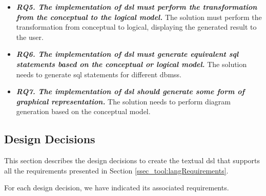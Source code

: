 \begin{itemize}
\item\textit{\textbf{RQ5. The implementation of \ac{dsl} must perform the transformation from the conceptual to the logical model.}}
The solution must perform the transformation from conceptual to logical, displaying the generated result to the user.

\item\textit{\textbf{RQ6. The implementation of \ac{dsl} must generate equivalent \ac{sql} statements based on the conceptual or logical model.}}
The solution needs to generate \ac{sql} statements for different \acp{dbms}.

\item\textit{\textbf{RQ7. The implementation of \ac{dsl} should generate some form of graphical representation.}}
The solution needs to perform diagram generation based on the conceptual model.

\end{itemize}

\subsection{Design Decisions} \label{ssec_tool:designDecisions}

This section describes the design decisions to create the textual \ac{dsl} that supports all the requirements presented in Section \ref{ssec_tool:langRequirements}.

For each design decision, we have indicated its associated requirements.


